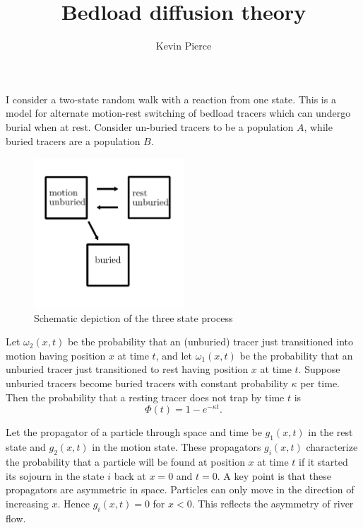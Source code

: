 \documentclass[11pt]{article}
\newcommand\be{\begin{equation}} %
\newcommand\ee{\end{equation}}   %
\begin{document}
\title{Bedload diffusion theory}
\author{Kevin Pierce}
\maketitle

I consider a two-state random walk with a reaction from one state.
This is a model for alternate motion-rest switching of bedload tracers which can undergo burial when at rest.
Consider un-buried tracers to be a population $A$, while buried tracers are a population $B$.

\begin{figure}
	\centering
	\includegraphics[width=0.5\textwidth,keepaspectratio]{diagram.png}
	\caption{Schematic depiction of the three state process}
	\label{fig:schematic}
\end{figure}

Let $\omega_2(x,t)$ be the probability that an (unburied) tracer just transitioned into motion having position $x$ at time $t$, and let $\omega_1(x,t)$ be the probability that an unburied tracer just transitioned to rest having position $x$ at time $t$.
Suppose unburied tracers become buried tracers with constant probability $\kappa$ per time.
Then the probability that a resting tracer does not trap by time $t$ is \be\Phi(t) = 1-e^{-\kappa t}.\ee

Let the propagator of a particle through space and time be $g_1(x,t)$ in the rest state and $g_2(x,t)$ in the motion state. These propagators $g_i(x,t)$ characterize the probability that a particle will be found at position $x$ at time $t$ if it started its sojourn in the state $i$ back at $x=0$ and $t=0$.
A key point is that these propagators are asymmetric in space. Particles can only move in the direction of increasing $x$. Hence $g_i(x,t)=0$ for $x<0$.
This reflects the asymmetry of river flow.
\end{document}
